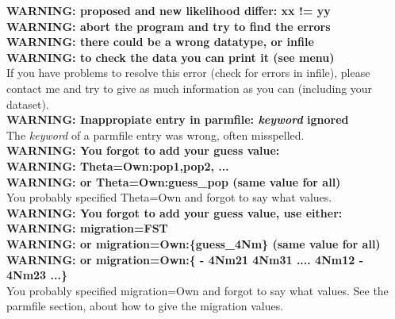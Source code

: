 {\bf WARNING: proposed and new likelihood differ: xx != yy}\\
{\bf WARNING: abort the program and try to find the errors}\\
{\bf WARNING: there could be a wrong datatype, or infile}\\
{\bf WARNING: to check the data you can print it (see menu)}\\
If you have problems to resolve this error (check for errors in infile), 
please contact me and try to give as much information 
as you can (including your dataset).\\
\smallerskip
{\bf WARNING: Inappropiate entry in parmfile: {\it keyword} ignored}\\
The {\it keyword} of a parmfile entry was wrong, often misspelled.\\
\smallerskip
{\bf WARNING: You forgot to add your guess value:}\\
{\bf WARNING: Theta=Own:{pop1,pop2, ...}}\\
{\bf WARNING: or Theta=Own:guess\_pop (same value for all)}\\
You probably specified Theta=Own and forgot to say what values.\\
\smallerskip
{\bf WARNING: You forgot to add your guess value, use either:}\\
{\bf WARNING: migration=FST}\\
{\bf WARNING: or migration=Own:\{guess\_4Nm\} (same value for all)}\\
{\bf WARNING: or migration=Own:\{ - 4Nm21 4Nm31 .... 4Nm12 - 4Nm23 ...\}}\\
You probably specified migration=Own and forgot to say what values.
See the parmfile section, about how to give the migration values.

